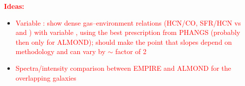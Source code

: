 \documentclass[letter, longauth]{aa} %
\begin{document}
\begin{appendix}
\vspace{10mm}
\noindent\textcolor{red}{\bf Ideas:}
\begin{itemize}
    \item \textcolor{red}{Variable \alphaco: show dense gas--environment relations (HCN/CO, SFR/HCN vs \sigmol and \pde) with variable \alphaco, using the best \alphaco prescription from PHANGS (probably then only for ALMOND); should make the point that slopes depend on methodology and can vary by $\sim$ factor of 2}
    \item \textcolor{red}{Spectra/intensity comparison between EMPIRE and ALMOND for the overlapping galaxies}
\end{itemize}



\end{appendix}
\end{document}
